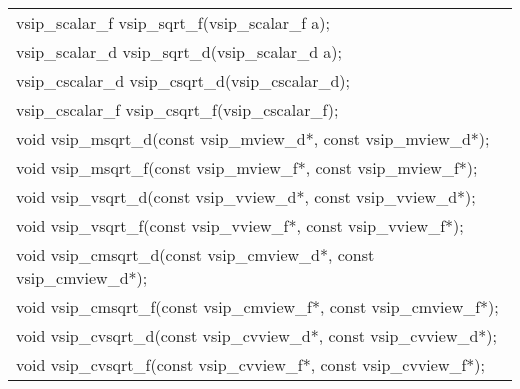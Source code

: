 \\\cvsiplh
\afh
\\\hspace*{.04\textwidth} {
\ttfamily
\begin{tabular}[H]{l}
vsip\_scalar\_f vsip\_sqrt\_f(vsip\_scalar\_f a);\\
vsip\_scalar\_d vsip\_sqrt\_d(vsip\_scalar\_d a);\\
vsip\_cscalar\_d vsip\_csqrt\_d(vsip\_cscalar\_d);\\
vsip\_cscalar\_f vsip\_csqrt\_f(vsip\_cscalar\_f);\\
void vsip\_msqrt\_d(const vsip\_mview\_d*, const vsip\_mview\_d*);\\
void vsip\_msqrt\_f(const vsip\_mview\_f*, const vsip\_mview\_f*);\\
void vsip\_vsqrt\_d(const vsip\_vview\_d*, const vsip\_vview\_d*);\\
void vsip\_vsqrt\_f(const vsip\_vview\_f*, const vsip\_vview\_f*);\\
void vsip\_cmsqrt\_d(const vsip\_cmview\_d*, const vsip\_cmview\_d*);\\
void vsip\_cmsqrt\_f(const vsip\_cmview\_f*, const vsip\_cmview\_f*);\\
void vsip\_cvsqrt\_d(const vsip\_cvview\_d*, const vsip\_cvview\_d*);\\
void vsip\_cvsqrt\_f(const vsip\_cvview\_f*, const vsip\_cvview\_f*);\\
\end{tabular}
}
\\\pyjvsiph
{}

